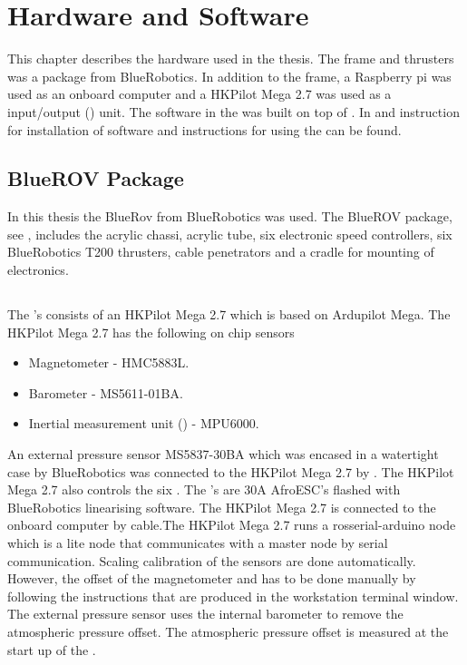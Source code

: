 \chapter{Hardware and Software}\label{cha:hardware}
This chapter describes the hardware used in the thesis. The \abbrROV frame and thrusters was a package from BlueRobotics. In addition to the \abbrROV frame, a Raspberry pi was used as an onboard computer and a HKPilot Mega 2.7  was used as a input/output (\abbrIO) unit. The software in the \abbrROV was built on top of \abbrROS. In  and  instruction for installation of software and instructions for using the \abbrROV can be found.

\section{BlueROV Package}
In this thesis the BlueRov from BlueRobotics was used. The BlueROV package, see , includes the acrylic chassi, acrylic tube, six electronic speed controllers, six BlueRobotics T200 thrusters, cable penetrators and a cradle for mounting of electronics.
\section{\abbrROV \abbrIO}
The \abbrROV's \abbrIO consists of an HKPilot Mega 2.7 which is based on Ardupilot Mega. The HKPilot Mega 2.7 has the following on chip sensors
\begin{itemize}
    \item Magnetometer - HMC5883L.
    \item Barometer - MS5611-01BA.
    \item Inertial measurement unit (\abbrIMU) - MPU6000.
\end{itemize}
An external pressure sensor MS5837-30BA which was encased in a watertight case by BlueRobotics was connected to the HKPilot Mega 2.7 by \abbrIC.
The HKPilot Mega 2.7 also controls the six \abbrESC. The \abbrESC's are 30A AfroESC's flashed with BlueRobotics linearising software. The HKPilot Mega 2.7 is connected to the onboard computer by \abbrUSB cable.The HKPilot Mega 2.7 runs a rosserial-arduino node which is a lite \abbrROS node that communicates with a master node by serial communication. Scaling calibration of the sensors are done automatically. However, the offset of the magnetometer and \abbrROV has to be done manually by following the instructions that are produced in the workstation terminal window. The external pressure sensor uses the internal barometer to remove the atmospheric pressure offset. The atmospheric pressure offset is measured at the start up of the \abbrROV.

